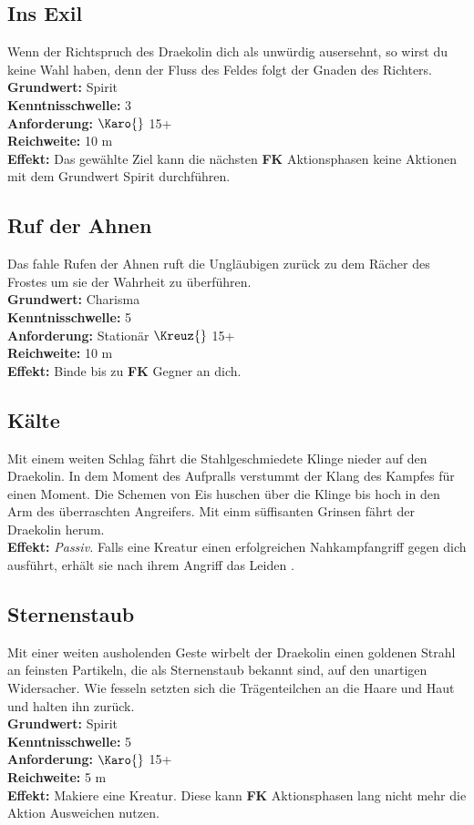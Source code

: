 \subsection*{Ins Exil} \label{sk:ins_exil}
Wenn der Richtspruch des Draekolin dich als unwürdig ausersehnt, so wirst du keine Wahl haben, denn der Fluss des Feldes folgt der Gnaden des Richters. \\
\textbf{Grundwert:} Spirit \\
\textbf{Kenntnisschwelle:} 3 \\
\textbf{Anforderung:} $\Karo{}$ 15+ \\
\textbf{Reichweite:} 10 m \\
\textbf{Effekt:} Das gewählte Ziel kann die nächsten \textbf{FK} Aktionsphasen keine Aktionen mit dem Grundwert Spirit durchführen.

\subsection*{Ruf der Ahnen} \label{sk:ruf_der_ahnen}
Das fahle Rufen der Ahnen ruft die Ungläubigen zurück zu dem Rächer des Frostes um sie der Wahrheit zu überführen.\\
\textbf{Grundwert:} Charisma \\
\textbf{Kenntnisschwelle:} 5 \\
\textbf{Anforderung:} Stationär $\Kreuz{}$ 15+ \\
\textbf{Reichweite:} 10 m \\
\textbf{Effekt:} Binde bis zu \textbf{FK} Gegner an dich.

\subsection*{Kälte} \label{sk:kaelte}
Mit einem weiten Schlag fährt die Stahlgeschmiedete Klinge nieder auf den Draekolin. In dem Moment des Aufpralls verstummt der Klang des Kampfes für einen Moment. Die Schemen von Eis huschen über die Klinge bis hoch in den Arm des überraschten Angreifers. Mit einm süffisanten Grinsen fährt der Draekolin herum. \\
\textbf{Effekt:} \textit{Passiv.} Falls eine Kreatur einen erfolgreichen Nahkampfangriff gegen dich ausführt, erhält sie nach ihrem Angriff das Leiden \textit{}.

\subsection*{Sternenstaub} \label{sk:sternenstaub}
Mit einer weiten ausholenden Geste wirbelt der Draekolin einen goldenen Strahl an feinsten Partikeln, die als Sternenstaub bekannt sind, auf den unartigen Widersacher. Wie fesseln setzten sich die Trägenteilchen an die Haare und Haut und halten ihn zurück.\\
\textbf{Grundwert:} Spirit \\
\textbf{Kenntnisschwelle:} 5 \\
\textbf{Anforderung:} $\Karo{}$ 15+ \\
\textbf{Reichweite:} 5 m\\
\textbf{Effekt:} Makiere eine Kreatur. Diese kann \textbf{FK} Aktionsphasen lang nicht mehr die Aktion Ausweichen nutzen.


